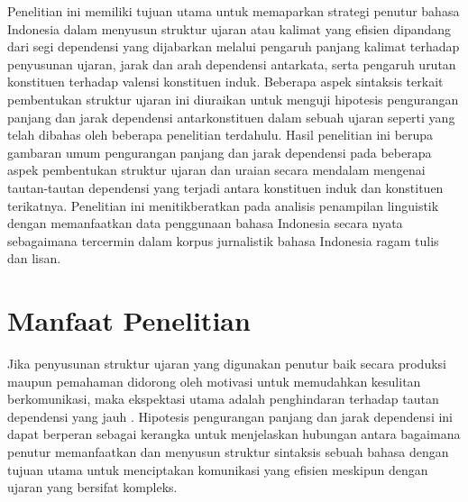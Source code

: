 Penelitian ini memiliki tujuan utama untuk memaparkan strategi penutur bahasa Indonesia dalam menyusun struktur ujaran atau kalimat yang efisien dipandang dari segi dependensi yang dijabarkan melalui pengaruh panjang kalimat terhadap penyusunan ujaran, jarak dan arah dependensi antarkata, serta pengaruh urutan konstituen terhadap valensi konstituen induk. Beberapa aspek sintaksis terkait pembentukan struktur ujaran ini diuraikan untuk menguji hipotesis pengurangan panjang dan jarak dependensi antarkonstituen dalam sebuah ujaran seperti yang telah dibahas oleh beberapa penelitian terdahulu. Hasil penelitian ini berupa gambaran umum pengurangan panjang dan jarak dependensi pada beberapa aspek pembentukan struktur ujaran dan uraian secara mendalam mengenai tautan-tautan dependensi yang terjadi antara konstituen induk dan konstituen terikatnya. Penelitian ini menitikberatkan pada analisis penampilan linguistik dengan memanfaatkan data penggunaan bahasa Indonesia secara nyata sebagaimana tercermin dalam korpus jurnalistik bahasa Indonesia ragam tulis dan lisan.



\section{Manfaat Penelitian}

Jika penyusunan struktur ujaran yang digunakan penutur baik secara produksi maupun pemahaman didorong oleh motivasi untuk memudahkan kesulitan berkomunikasi, maka ekspektasi utama adalah penghindaran terhadap tautan dependensi yang jauh \citep{futrell2015large}. Hipotesis pengurangan panjang dan jarak dependensi ini dapat berperan sebagai kerangka untuk menjelaskan hubungan antara bagaimana penutur memanfaatkan dan menyusun struktur sintaksis sebuah bahasa dengan tujuan utama untuk menciptakan komunikasi yang efisien meskipun dengan ujaran yang bersifat kompleks.

